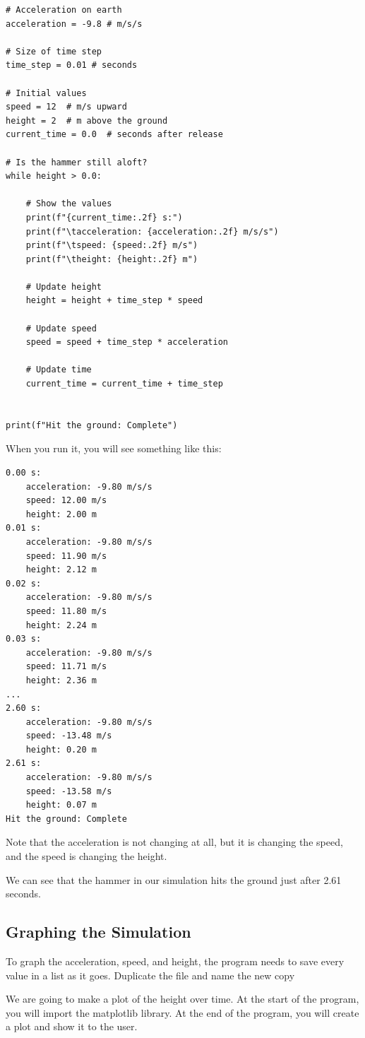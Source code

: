 \begin{verbatim}
# Acceleration on earth
acceleration = -9.8 # m/s/s

# Size of time step
time_step = 0.01 # seconds

# Initial values
speed = 12  # m/s upward
height = 2  # m above the ground
current_time = 0.0  # seconds after release

# Is the hammer still aloft?
while height > 0.0:

    # Show the values
    print(f"{current_time:.2f} s:")
    print(f"\tacceleration: {acceleration:.2f} m/s/s")
    print(f"\tspeed: {speed:.2f} m/s")
    print(f"\theight: {height:.2f} m")

    # Update height
    height = height + time_step * speed

    # Update speed
    speed = speed + time_step * acceleration

    # Update time
    current_time = current_time + time_step


print(f"Hit the ground: Complete")
\end{verbatim}

When you run it, you will see something like this:
\begin{verbatim}
0.00 s:
	acceleration: -9.80 m/s/s
	speed: 12.00 m/s
	height: 2.00 m
0.01 s:
	acceleration: -9.80 m/s/s
	speed: 11.90 m/s
	height: 2.12 m
0.02 s:
	acceleration: -9.80 m/s/s
	speed: 11.80 m/s
	height: 2.24 m
0.03 s:
	acceleration: -9.80 m/s/s
	speed: 11.71 m/s
	height: 2.36 m
...
2.60 s:
	acceleration: -9.80 m/s/s
	speed: -13.48 m/s
	height: 0.20 m
2.61 s:
	acceleration: -9.80 m/s/s
	speed: -13.58 m/s
	height: 0.07 m
Hit the ground: Complete
\end{verbatim}

Note that the acceleration is not changing at all, but it is changing
the speed, and the speed is changing the height.

We can see that the hammer in our simulation hits the ground just
after 2.61 seconds.

\subsection{Graphing the Simulation}

To graph the acceleration, speed, and height, the program needs to save every value in a list as it goes.
Duplicate the file  and name the new copy 

We are going to make a plot of the height over time. At the start of the 
program, you will import the matplotlib library.  At the end of the program, 
you will create a plot and show it to the user.

